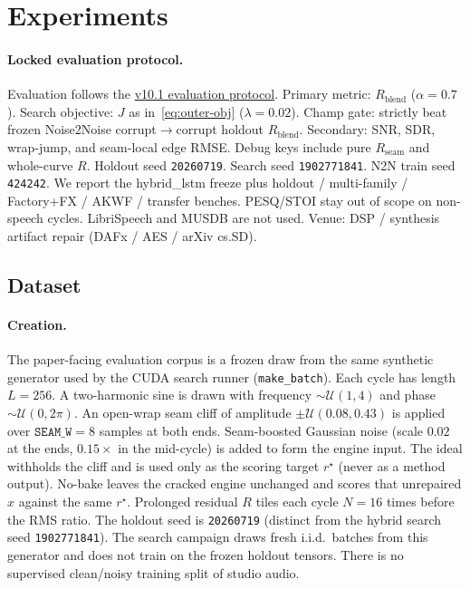 \section{Experiments}
\label{sec:experiments}

\paragraph{Locked evaluation protocol.}
Evaluation follows the \href{https://github.com/reeldemo/denoise-opt-meta/blob/master/paper/Unsupervised_Wavetable_Seam_Artifact_Repair_via_Hybrid_GA-PPO_Meta-Search_v11/EVAL_PROTOCOL.md}{v10.1 evaluation protocol}.
Primary metric: $R_{\mathrm{blend}}$ ($\alpha{=}0.7$).
Search objective: $J$ as in~\eqref{eq:outer-obj} ($\lambda{=}0.02$).
Champ gate: strictly beat frozen Noise2Noise corrupt$\to$corrupt holdout $R_{\mathrm{blend}}$.
Secondary: SNR, SDR, wrap-jump, and seam-local edge RMSE. Debug keys include pure $R_{\mathrm{seam}}$ and whole-curve $R$.
Holdout seed \texttt{20260719}. Search seed \texttt{1902771841}. N2N train seed \texttt{424242}.
We report the hybrid\_lstm freeze plus holdout / multi-family / Factory+FX / AKWF / transfer benches.
PESQ/STOI stay out of scope on non-speech cycles. LibriSpeech and MUSDB are not used.
Venue: DSP / synthesis artifact repair (DAFx / AES / arXiv cs.SD).

\subsection{Dataset}
\label{sec:dataset}

\paragraph{Creation.}
The paper-facing evaluation corpus is a frozen draw from the same synthetic generator used by the CUDA search runner (\texttt{make\_batch}).
Each cycle has length $L{=}256$.
A two-harmonic sine is drawn with frequency $\sim\mathcal{U}(1,4)$ and phase $\sim\mathcal{U}(0,2\pi)$.
An open-wrap seam cliff of amplitude $\pm\mathcal{U}(0.08,0.43)$ is applied over $\texttt{SEAM\_W}{=}8$ samples at both ends.
Seam-boosted Gaussian noise (scale $0.02$ at the ends, $0.15\times$ in the mid-cycle) is added to form the engine input.
The ideal withholds the cliff and is used only as the scoring target $r^{\star}$ (never as a method output).
No-bake leaves the cracked engine unchanged and scores that unrepaired $x$ against the same $r^{\star}$.
Prolonged residual $R$ tiles each cycle $N{=}16$ times before the RMS ratio.
The holdout seed is \texttt{20260719} (distinct from the hybrid search seed \texttt{1902771841}).
The search campaign draws fresh i.i.d.\ batches from this generator and does not train on the frozen holdout tensors.
There is no supervised clean/noisy training split of studio audio.

